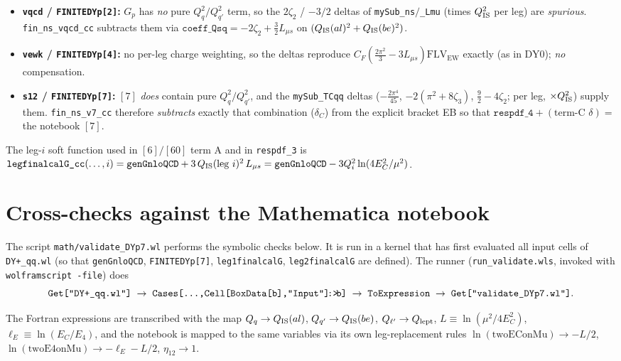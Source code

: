 \documentclass[11pt]{article}
\newcommand{\code}[1]{\texttt{#1}}
\newcommand{\file}[1]{\texttt{#1}}
\newcommand{\FLVEW}{\ensuremath{\mathrm{FLV}_{\mathrm{EW}}}}
\newcommand{\Lms}{\ensuremath{L_{\mu s}}}
\newcommand{\zt}{\ensuremath{\zeta_2}}\newcommand{\ztt}{\ensuremath{\zeta_3}}
\begin{document}
\begin{itemize}
\item \textbf{\code{vqcd} / \code{FINITEDYp[2]}:} $G_p$ has \emph{no} pure $Q_q^2/Q_{q'}^2$ term,
  so the $2\zt$ / $-3/2$ deltas of \code{mySub\_ns}$/$\code{\_Lmu} (times $Q_{\rm IS}^2$ per leg)
  are \emph{spurious}. \code{fin\_ns\_vqcd\_cc} subtracts them via
  $\mathtt{coeff\_Qsq}=-2\zt+\tfrac32\Lms$ on $(Q_{\rm IS}(al)^2+Q_{\rm IS}(be)^2)$.
\item \textbf{\code{vewk} / \code{FINITEDYp[4]}:} no per-leg charge weighting, so the deltas
  reproduce $C_F(\tfrac{2\pi^2}{3}-3\Lms)\FLVEW$ exactly (as in DY0); \emph{no} compensation.
\item \textbf{\code{s12} / \code{FINITEDYp[7]}:} $[7]$ \emph{does} contain pure
  $Q_q^2/Q_{q'}^2$, and the \code{mySub\_TCqq} deltas ($-\tfrac{2\pi^4}{45}$,
  $-2(\pi^2{+}8\ztt)$, $\tfrac92{-}4\zt$; per leg, $\times Q_{\rm IS}^2$) supply them.
  \code{fin\_ns\_v7\_cc} therefore \emph{subtracts} exactly that combination
  ($\delta_C$) from the explicit bracket EB so that
  $\mathtt{respdf\_4}+(\text{term-C }\delta)=$ the notebook $[7]$.
\end{itemize}

The leg-$i$ soft function used in $[6]/[60]$ term A and in \code{respdf\_3} is
$\texttt{legfinalcalG\_cc}(\dots,i)=\texttt{genGnloQCD}+3\,Q_{\rm IS}(\text{leg }i)^2\,\Lms
=\texttt{genGnloQCD}-3Q_i^2\ln(4E_C^2/\mu^2)$.

\section{Cross-checks against the Mathematica notebook}
\label{sec:valid}

The script \file{math/validate\_DYp7.wl} performs the symbolic checks below. It is run in a
kernel that has first evaluated all input cells of \file{DY+\_qq.wl} (so that
\code{genGnloQCD}, \code{FINITEDYp[7]}, \code{leg1finalcalG}, \code{leg2finalcalG} are defined).
The runner (\code{run\_validate.wls}, invoked with \code{wolframscript -file}) does
\[
\code{Get["DY+\_qq.wl"]}\;\to\;\code{Cases[\ldots,Cell[BoxData[b],"Input"]\!:>\!b]}\;\to\;
\code{ToExpression}\;\to\;\code{Get["validate\_DYp7.wl"]} .
\]

The Fortran expressions are transcribed with the map $Q_q\to Q_{\rm IS}(al)$,
$Q_{q'}\to Q_{\rm IS}(be)$, $Q_{\ell'}\to Q_{\rm lept}$, $L\equiv\ln(\mu^2/4E_C^2)$,
$\ell_E\equiv\ln(E_C/E_4)$, and the notebook is mapped to the same variables via its own
leg-replacement rules
$\ln(\text{twoEConMu})\to-L/2$, $\ln(\text{twoE4onMu})\to-\ell_E-L/2$, $\eta_{12}\to1$.
\end{document}
